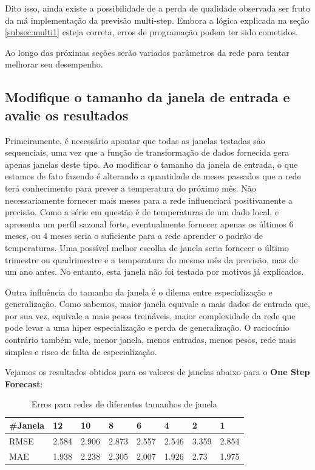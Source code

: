 \documentclass[12pt]{article}
\begin{document}
	Dito isso, ainda existe a possibilidade de a perda de qualidade observada ser fruto da má implementação da previsão multi-step. Embora a lógica explicada na seção \ref{subsec:multi1} esteja correta, erros de programação podem ter sido cometidos. 
	
	Ao longo das próximas seções serão variados parâmetros da rede para tentar melhorar seu desempenho.
	
	
	\subsection{Modifique o tamanho da janela de entrada e avalie os resultados}
	
	Primeiramente, é necessário apontar que todas as janelas testadas são sequenciais, uma vez que a função de transformação de dados fornecida gera apenas janelas deste tipo. Ao modificar o tamanho da janela de entrada, o que estamos de fato fazendo é alterando a quantidade de meses passados que a rede terá conhecimento para prever a temperatura do próximo mês. Não necessariamente fornecer mais meses para a rede influenciará positivamente a precisão. Como a série em questão é de temperaturas de um dado local, e apresenta um perfil sazonal forte, eventualmente fornecer apenas os últimos 6 meses, ou 4 meses seria o suficiente para a rede aprender o padrão de temperaturas. Uma possível melhor escolha de janela seria fornecer o último trimestre ou quadrimestre e a temperatura do mesmo mês da previsão, mas de um ano antes. No entanto, esta janela não foi testada por motivos já explicados.
	
	Outra influência do tamanho da janela é o dilema entre especialização e generalização. Como sabemos, maior janela equivale a mais dados de entrada que, por sua vez, equivale a mais pesos treináveis, maior complexidade da rede que pode levar a uma hiper especialização e perda de generalização. O raciocínio contrário também vale, menor janela, menos entradas, menos pesos, rede mais simples e risco de falta de especialização.
	
	Vejamos os resultados obtidos para os valores de janelas abaixo para o \textbf{One Step Forecast}:
	
	\begin{table}[H]
		\centering
		\begin{tabular}{|l|l|l|l|l|l|l|l|}
			
			\hline
			\#Janela & 12    & 10    & 8     & 6     & 4     & 2     & 1     \\ \hline
			RMSE     & 2.584 & 2.906 & 2.873 & 2.557 & 2.546 & 3.359 & 2.854 \\ \hline
			MAE      & 1.938 & 2.238 & 2.305 & 2.007 & 1.926 & 2.73  & 1.975 \\ \hline
		\end{tabular}
		\caption{Erros para redes de diferentes tamanhos de janela}
	\end{table}
\end{document}
